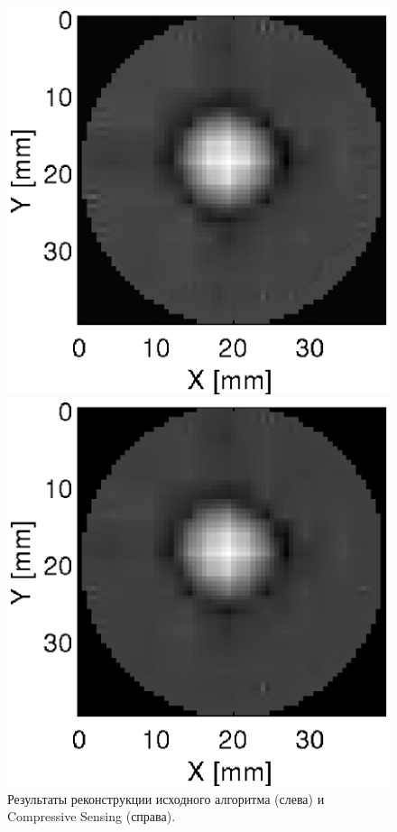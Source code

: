 \documentclass[14pt]{matmex-diploma}
\begin{document}
\begin{figure}[!tbp]
    \centering
    \begin{minipage}[b]{0.45\textwidth}
        \includegraphics[width=\textwidth]{pics_eps/slice_base_grad.eps}
    \end{minipage}
    \hfill
    \begin{minipage}[b]{0.45\textwidth}
        \includegraphics[width=\textwidth]{pics_eps/slice_cs_grad.eps}
    \end{minipage}
    \caption{\small Результаты реконструкции исходного алгоритма (слева) и Compressive Sensing (справа).}
    \label{fig:reconstruction_exp1}
\end{figure}
\end{document}
